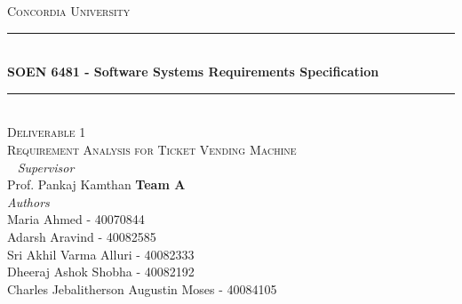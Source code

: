\documentclass[a4paper, 11pt]{report}
\date{null}
\begin{document}
\begin{titlepage} %
	\newcommand{\HRule}{\rule{\linewidth}{0.5mm}} %
	
	\center %
	
	
	\textsc{\LARGE Concordia University}\\[1.5cm] %
	

	
	\HRule\\[0.4cm]
	
	{\huge\bfseries  SOEN 6481 - Software Systems Requirements Specification}\\[0.4cm] %
	
	\HRule\\[1.5cm]
	\textsc{\Large Deliverable 1}\\[0.5cm] %
	\textsc{\Large Requirement Analysis for Ticket Vending Machine}\\[0.5cm]
	
			
	~
			\large
			\textit{Supervisor}\\
			Prof. Pankaj Kamthan %
    \vfill
    \large
            \textbf{Team A}\\
			\textit{Authors}\\
			Maria Ahmed - \textsc{40070844}\\
            Adarsh Aravind - \textsc{40082585}\\
            Sri Akhil Varma Alluri - \textsc{40082333}\\
            Dheeraj Ashok Shobha - \textsc{40082192}\\
            Charles Jebalitherson Augustin Moses - \textsc {40084105}\\
            

\end{titlepage}
\end{document}
